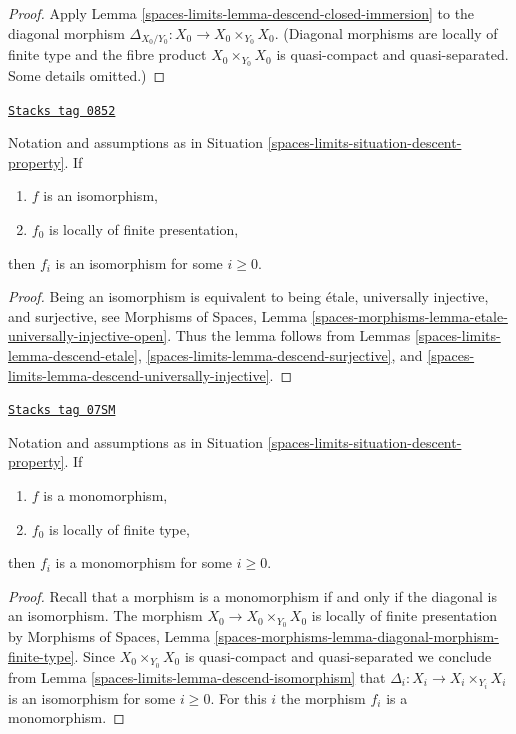 \begin{proof}
Apply Lemma \ref{spaces-limits-lemma-descend-closed-immersion}
to the diagonal morphism $\Delta_{X_0/Y_0} : X_0 \to X_0 \times_{Y_0} X_0$.
(Diagonal morphisms are locally of finite type
and the fibre product $X_0 \times_{Y_0} X_0$ is quasi-compact and
quasi-separated. Some details omitted.)
\end{proof}

\begin{lemma}
\label{spaces-limits-lemma-descend-isomorphism}
\href{https://stacks.math.columbia.edu/tag/0852}{\texttt{Stacks tag 0852}}

Notation and assumptions as in Situation \ref{spaces-limits-situation-descent-property}. If
\begin{enumerate}
\item $f$ is an isomorphism,
\item $f_0$ is locally of finite presentation,
\end{enumerate}
then $f_i$ is an isomorphism for some $i \geq 0$.
\end{lemma}

\begin{proof}
Being an isomorphism is equivalent to being \'etale, universally injective,
and surjective, see
Morphisms of Spaces, Lemma
\ref{spaces-morphisms-lemma-etale-universally-injective-open}.
Thus the lemma follows from
Lemmas \ref{spaces-limits-lemma-descend-etale},
\ref{spaces-limits-lemma-descend-surjective}, and
\ref{spaces-limits-lemma-descend-universally-injective}.
\end{proof}

\begin{lemma}
\label{spaces-limits-lemma-descend-monomorphism}
\href{https://stacks.math.columbia.edu/tag/07SM}{\texttt{Stacks tag 07SM}}

Notation and assumptions as in Situation \ref{spaces-limits-situation-descent-property}. If
\begin{enumerate}
\item $f$ is a monomorphism,
\item $f_0$ is locally of finite type,
\end{enumerate}
then $f_i$ is a monomorphism for some $i \geq 0$.
\end{lemma}

\begin{proof}
Recall that a morphism is a monomorphism if and only if the diagonal is
an isomorphism. The morphism $X_0 \to X_0 \times_{Y_0} X_0$ is locally of
finite presentation by
Morphisms of Spaces, Lemma
\ref{spaces-morphisms-lemma-diagonal-morphism-finite-type}.
Since $X_0 \times_{Y_0} X_0$ is quasi-compact and quasi-separated
we conclude from
Lemma \ref{spaces-limits-lemma-descend-isomorphism}
that $\Delta_i : X_i \to X_i \times_{Y_i} X_i$ is an isomorphism for
some $i \geq 0$. For this $i$ the morphism $f_i$ is a monomorphism.
\end{proof}

